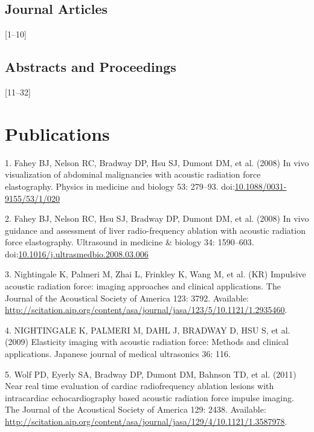 \documentclass[letterpaper,10pt,english]{sphinxmanual}
\begin{document}
\subsection{Journal Articles}
\label{resume:journal-articles}
{[}1–10{]}


\subsection{Abstracts and Proceedings}
\label{resume:abstracts-and-proceedings}
{[}11–32{]}


\section{Publications}
\label{resume:publications}
1. Fahey BJ, Nelson RC, Bradway DP, Hsu SJ, Dumont DM, et al. (2008) In
vivo visualization of abdominal malignancies with acoustic radiation
force elastography. Physics in medicine and biology 53: 279–93.
doi:\href{http://dx.doi.org/10.1088/0031-9155/53/1/020}{10.1088/0031-9155/53/1/020}

2. Fahey BJ, Nelson RC, Hsu SJ, Bradway DP, Dumont DM, et al. (2008) In
vivo guidance and assessment of liver radio-frequency ablation with
acoustic radiation force elastography. Ultrasound in medicine \& biology
34: 1590–603.
doi:\href{http://dx.doi.org/10.1016/j.ultrasmedbio.2008.03.006}{10.1016/j.ultrasmedbio.2008.03.006}

3. Nightingale K, Palmeri M, Zhai L, Frinkley K, Wang M, et al. (KR)
Impulsive acoustic radiation force: imaging approaches and clinical
applications. The Journal of the Acoustical Society of America 123:
3792. Available:
\href{http://scitation.aip.org/content/asa/journal/jasa/123/5/10.1121/1.2935460}{http://scitation.aip.org/content/asa/journal/jasa/123/5/10.1121/1.2935460}.

4. NIGHTINGALE K, PALMERI M, DAHL J, BRADWAY D, HSU S, et al. (2009)
Elasticity imaging with acoustic radiation force: Methods and clinical
applications. Japanese journal of medical ultrasonics 36: 116.

5. Wolf PD, Eyerly SA, Bradway DP, Dumont DM, Bahnson TD, et al. (2011)
Near real time evaluation of cardiac radiofrequency ablation lesions
with intracardiac echocardiography based acoustic radiation force
impulse imaging. The Journal of the Acoustical Society of America 129:
2438. Available:
\href{http://scitation.aip.org/content/asa/journal/jasa/129/4/10.1121/1.3587978}{http://scitation.aip.org/content/asa/journal/jasa/129/4/10.1121/1.3587978}.
\end{document}
